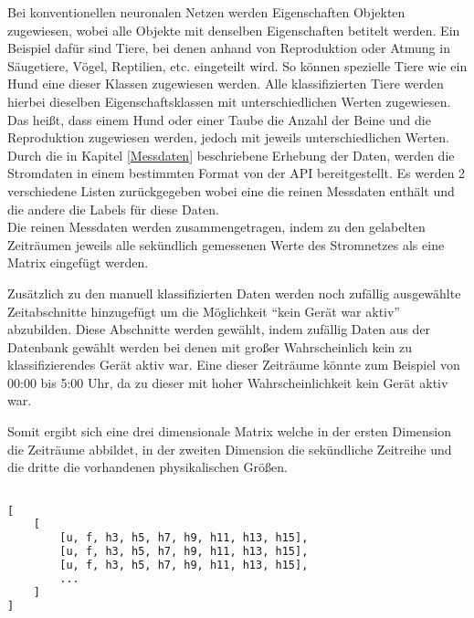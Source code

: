    \noindent
    Bei konventionellen neuronalen Netzen werden Eigenschaften Objekten zugewiesen, wobei alle Objekte mit denselben Eigenschaften betitelt werden.
    Ein Beispiel dafür sind Tiere, bei denen anhand von Reproduktion oder Atmung in Säugetiere, Vögel, Reptilien, etc. eingeteilt wird. 
    So können spezielle Tiere wie ein Hund eine dieser Klassen zugewiesen werden.
    Alle klassifizierten Tiere werden hierbei dieselben Eigenschaftsklassen mit unterschiedlichen Werten zugewiesen.
    Das heißt, dass einem Hund oder einer Taube die Anzahl der Beine und die Reproduktion zugewiesen werden, jedoch mit jeweils unterschiedlichen Werten.\\
    
    Durch die in Kapitel \ref{Messdaten} beschriebene Erhebung der Daten, werden die Stromdaten in einem bestimmten Format von der API bereitgestellt.
    Es werden 2 verschiedene Listen zurückgegeben wobei eine die reinen Messdaten enthält und die andere die Labels für diese Daten.\\
    Die reinen Messdaten werden zusammengetragen, indem zu den gelabelten Zeiträumen jeweils alle sekündlich gemessenen Werte des Stromnetzes als eine Matrix eingefügt werden.
    \newline

    \noindent
    Zusätzlich zu den manuell klassifizierten Daten werden noch zufällig ausgewählte Zeitabschnitte hinzugefügt um die Möglichkeit "`kein Gerät war aktiv"' abzubilden.
    Diese Abschnitte werden gewählt, indem zufällig Daten aus der Datenbank gewählt werden bei denen mit großer Wahrscheinlich kein zu klassifizierendes Gerät aktiv war.
    Eine dieser Zeiträume könnte zum Beispiel von 00:00 bis 5:00 Uhr, da zu dieser mit hoher Wahrscheinlichkeit kein Gerät aktiv war.
    \newline

    \noindent
    Somit ergibt sich eine drei dimensionale Matrix welche in der ersten Dimension die Zeiträume abbildet, in der zweiten Dimension die sekündliche Zeitreihe und die dritte die vorhandenen physikalischen Größen.

    \begin{lstlisting}[language=Python, caption={Datenstruktur der gelabelten Messdaten, die von der API bereit gestellt wird},label=lst:DatenstrukturGelabelteMessdaten]

[
    [
        [u, f, h3, h5, h7, h9, h11, h13, h15],
        [u, f, h3, h5, h7, h9, h11, h13, h15],
        [u, f, h3, h5, h7, h9, h11, h13, h15],
        ...
    ]
]
    \end{lstlisting}

